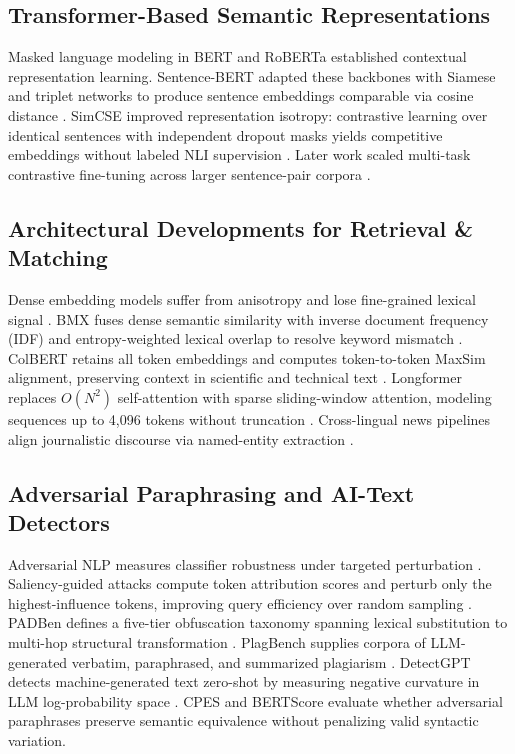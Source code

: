 \documentclass[conference,onecolumn,11pt]{IEEEtran}
\begin{document}
\subsection{Transformer-Based Semantic Representations}
Masked language modeling in BERT \cite{devlin2019bert} and RoBERTa \cite{liu2019roberta} established contextual representation learning. Sentence-BERT adapted these backbones with Siamese and triplet networks to produce sentence embeddings comparable via cosine distance \cite{reimers2019sbert}. SimCSE improved representation isotropy: contrastive learning over identical sentences with independent dropout masks yields competitive embeddings without labeled NLI supervision \cite{gao2021simcse}. Later work scaled multi-task contrastive fine-tuning across larger sentence-pair corpora \cite{ni2022sentence}.

\subsection{Architectural Developments for Retrieval \& Matching}
Dense embedding models suffer from anisotropy and lose fine-grained lexical signal \cite{li2024bmx, robertson2009bm25}. BMX fuses dense semantic similarity with inverse document frequency (IDF) and entropy-weighted lexical overlap to resolve keyword mismatch \cite{li2024bmx, yoo2023patent}. ColBERT retains all token embeddings and computes token-to-token MaxSim alignment, preserving context in scientific and technical text \cite{khattab2020colbert, mysore2022scientific, santhanam2022colbertv2}. Longformer replaces $O(N^2)$ self-attention with sparse sliding-window attention, modeling sequences up to 4,096 tokens without truncation \cite{beltagy2020longformer, oliveira2022legal, jha2023longform}. Cross-lingual news pipelines align journalistic discourse via named-entity extraction \cite{goel2022wolfies}.

\subsection{Adversarial Paraphrasing and AI-Text Detectors}
Adversarial NLP measures classifier robustness under targeted perturbation \cite{morris2020textattack, waghela2024sassp}. Saliency-guided attacks compute token attribution scores and perturb only the highest-influence tokens, improving query efficiency over random sampling \cite{waghela2024sassp}. PADBen defines a five-tier obfuscation taxonomy spanning lexical substitution to multi-hop structural transformation \cite{zha2025padben}. PlagBench supplies corpora of LLM-generated verbatim, paraphrased, and summarized plagiarism \cite{lee2025plagbench}. DetectGPT detects machine-generated text zero-shot by measuring negative curvature in LLM log-probability space \cite{mitchell2023detectgpt, hans2024spotting}. CPES \cite{alsulami2026cpes} and BERTScore \cite{zhang2019bertscore} evaluate whether adversarial paraphrases preserve semantic equivalence without penalizing valid syntactic variation.
\end{document}
